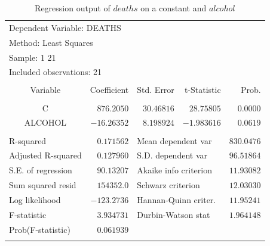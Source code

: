 \documentclass[12pt]{report}
\begin{document}
		\vspace{-\baselineskip}		
		\begin{table}[H]
			\centering
			\begin{tabular}{lrrrr}
				\multicolumn{3}{l}{Dependent Variable: DEATHS}&\multicolumn{1}{c}{}&\multicolumn{1}{c}{}\\
				\multicolumn{3}{l}{Method: Least Squares}&\multicolumn{1}{c}{}&\multicolumn{1}{c}{}\\
				\multicolumn{2}{l}{Sample: 1 21}&\multicolumn{1}{c}{}&\multicolumn{1}{c}{}&\multicolumn{1}{c}{}\\
				\multicolumn{3}{l}{Included observations: 21}&\multicolumn{1}{c}{}&\multicolumn{1}{c}{}\\
				[4.5pt] \hline \\ [-4.5pt]
				\multicolumn{1}{c}{Variable}&\multicolumn{1}{r}{Coefficient}&\multicolumn{1}{r}{Std. Error}&\multicolumn{1}{r}{t-Statistic}&\multicolumn{1}{r}{Prob.}\\
				[4.5pt] \hline \\ [-4.5pt]
				\multicolumn{1}{c}{C}&\multicolumn{1}{r}{$876.2050$}&\multicolumn{1}{r}{$30.46816$}&\multicolumn{1}{r}{$28.75805$}&\multicolumn{1}{r}{$0.0000$}\\
				\multicolumn{1}{c}{ALCOHOL}&\multicolumn{1}{r}{$-16.26352$}&\multicolumn{1}{r}{$8.198924$}&\multicolumn{1}{r}{$-1.983616$}&\multicolumn{1}{r}{$0.0619$}\\
				[4.5pt] \hline \\ [-4.5pt]
				\multicolumn{1}{l}{R-squared}&\multicolumn{1}{r}{$0.171562$}&\multicolumn{2}{l}{Mean dependent var}&\multicolumn{1}{r}{$830.0476$}\\
				\multicolumn{1}{l}{Adjusted R-squared}&\multicolumn{1}{r}{$0.127960$}&\multicolumn{2}{l}{S.D. dependent var}&\multicolumn{1}{r}{$96.51864$}\\
				\multicolumn{1}{l}{S.E. of regression}&\multicolumn{1}{r}{$90.13207$}&\multicolumn{2}{l}{Akaike info criterion}&\multicolumn{1}{r}{$11.93082$}\\
				\multicolumn{1}{l}{Sum squared resid}&\multicolumn{1}{r}{$154352.0$}&\multicolumn{2}{l}{Schwarz criterion}&\multicolumn{1}{r}{$12.03030$}\\
				\multicolumn{1}{l}{Log likelihood}&\multicolumn{1}{r}{$-123.2736$}&\multicolumn{2}{l}{Hannan-Quinn criter.}&\multicolumn{1}{r}{$11.95241$}\\
				\multicolumn{1}{l}{F-statistic}&\multicolumn{1}{r}{$3.934731$}&\multicolumn{2}{l}{Durbin-Watson stat}&\multicolumn{1}{r}{$1.964148$}\\
				\multicolumn{1}{l}{Prob(F-statistic)}&\multicolumn{1}{r}{$0.061939$}&\multicolumn{1}{c}{}&\multicolumn{1}{c}{}&\multicolumn{1}{c}{}\\
				[4.5pt] \hline \\ [-4.5pt]
			\end{tabular}
			\caption{Regression output of $deaths$ on a constant and $alcohol$}
			\label{tbl:regout1}
		\end{table}
\end{document}

